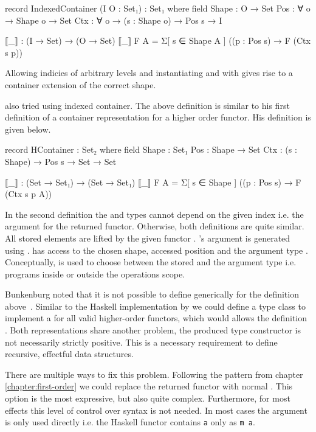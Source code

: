\begin{code}
record IndexedContainer (I O : Set₁) : Set₁ where
  field
    Shape : O → Set
    Pos : ∀ {o} → Shape o → Set
    Ctx : ∀ {o} → (s : Shape o) → Pos s → I

  ⟦_⟧ : (I → Set) → (O → Set)
  ⟦_⟧ F A = Σ[ s ∈ Shape A ] ((p : Pos s) → F (Ctx s p))
\end{code}
Allowing indicies of arbitrary levels and instantiating  and
 with  gives rise to a container extension
of the correct shape.

\textcite{bunkenburg2019modeling} also tried using indexed container.
The above definition is similar to his first definition of a container
representation for a higher order functor.
His definition is given below.
\begin{code}
record HContainer : Set₂ where
  field
    Shape : Set₁
    Pos : Shape → Set
    Ctx : (s : Shape) → Pos s → Set → Set

  ⟦_⟧ : (Set → Set₁) → (Set → Set₁)
  ⟦_⟧ F A = Σ[ s ∈ Shape ] ((p : Pos s) → F (Ctx s p A))
\end{code}
In the second definition the  and  types cannot
depend on the given index i.e. the argument for the returned functor.
Otherwise, both definitions are quite similar.
All stored elements are lifted by the given functor .
's argument is generated using .
 has access to the chosen shape, accessed position and the 
argument type .
Conceptually,  is used to choose between the stored
 and the argument type  i.e. programs inside or
outside the operations scope.

Bunkenburg noted that it is not possible to define \AgdaFunction{>>=}
generically for the definition above~\cite{bunkenburg2019modeling}.
Similar to the Haskell implementation by \textcite{DBLP:conf/haskell/WuSH14} we
could define a type class to implement a  for all valid
higher-order functors, which would allows the definition \AgdaFunction{>>=}.
Both representations share another problem, the produced type constructor is not
necessarily strictly positive.
This is a necessary requirement to define recursive, effectful data structures.

There are multiple ways to fix this problem.
Following the pattern from chapter \ref{chapter:first-order} we could replace
the returned functor with normal .
This option is the most expressive, but also quite complex.
Furthermore, for most effects this level of control over syntax is not needed.
In most cases the argument  is only used directly i.e. the
Haskell functor contains \texttt{a} only as \texttt{m a}.

